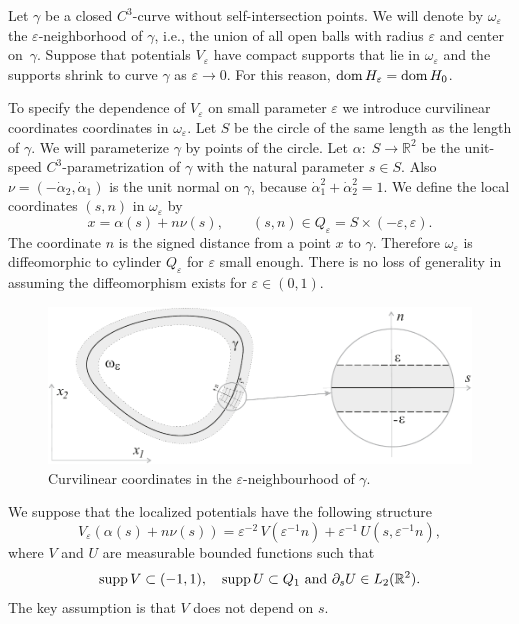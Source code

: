 \documentclass[reqno]{amsart}
\theoremstyle{plain}
\numberwithin{equation}{section}
\newcommand{\dom}{\mathop{\rm dom}}
\newcommand{\supp}{\mathop{\rm supp}}
\newcommand{\Real}{\mathbb R}
\newcommand{\eps}{\varepsilon}
\begin{document}
Let $\gamma$ be a  closed $C^3$-curve without self-intersection
points. We will denote by $\omega_\eps$ the $\eps$-neighborhood of $\gamma$, i.e., the union of all open balls with radius $\eps$ and center on~$\gamma$.  Suppose that potentials $V_\eps$ have compact supports that lie in $\omega_\eps$ and  the supports  shrink to curve $\gamma$ as $\eps\to 0$. For this reason, $\dom H_\eps=\dom H_0$.


To specify  the dependence of $V_\eps$ on  small parameter $\eps$ we introduce  curvilinear coordinates coordinates in $\omega_\eps$.
Let $S$ be the circle of the same length as the length of $\gamma$.
We will parameterize $\gamma$ by points of the circle.
Let $\alpha\colon\; S\to \Real^2$ be the unit-speed $C^3$-parametrization of $\gamma$ with the natural parameter $s\in S$.
Also  $\nu=(-\dot{\alpha}_2, \dot{\alpha}_1)$ is the unit normal on $\gamma$, because  $\dot{\alpha}_1^2+\dot{\alpha}_2^2=1$.
We define the local coordinates $(s,n)$ in $\omega_\eps$ by
\begin{equation}\label{LocalTr}
    x=\alpha(s)+n\nu(s), \qquad (s,n)\in Q_\eps=S\times (-\eps, \eps).
\end{equation}
The coordinate $n$ is the signed distance from a point $x$ to $\gamma$.
Therefore  $\omega_\eps$ is diffeomorphic to cylinder $Q_\eps$ for $\eps$ small enough. There is no loss of generality in assuming the diffeomorphism exists for $\eps\in (0,1)$.

\begin{figure}[b]
\centering
\includegraphics[scale=.6]{LocalCoords}
\caption{Curvilinear coordinates in the $\eps$-neighbourhood of $\gamma$.}
\label{FigLocalCoords}
\end{figure}


We suppose that the localized potentials have the following structure
\begin{equation}\label{Veps}
V_\eps(\alpha(s)+n\nu(s))=\eps^{-2}\,V\left(\eps^{-1}n\right)
+\eps^{-1}\,U\left(s,\eps^{-1}n\right),
\end{equation}
where $V$ and $U$ are measurable bounded functions such that
\begin{equation}\label{pdsU}
\supp V\subset (-1,1), \quad \supp U\subset Q_1 \mbox{ and }\partial_s U\in L_2(\Real^2).
\end{equation}
 The key assumption is that $V$ does not depend on  $s$.
\end{document}
